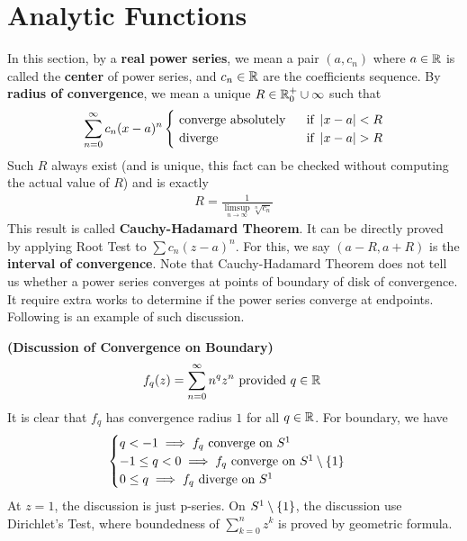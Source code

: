 \documentclass{report}
\begin{document}
\section{Analytic Functions}
\begin{mdframed}
In this section, by a  \textbf{real power series}, we mean a pair $(a,c_n)$ where $a \in\mathbb{R}$ is called the \textbf{center} of power series, and $c_n\in\mathbb{R}$ are the coefficients sequence. By \textbf{radius of convergence}, we mean a unique  $R \in \mathbb{R}^+_0 \cup  \infty$ such that 
 \begin{align*}
\sum_{n=0}^\infty c_n(x-a)^n
\begin{cases}
  \text{ converge absolutely }& \text{ if  }\abso{x-a}<R\\
  \text{ diverge }& \text{ if  }\abso{x-a}>R\\
\end{cases}
\end{align*}
Such $R$ always exist (and is unique, this fact can be checked without computing the actual value of $R$) and is exactly 
\begin{align}
\label{Cauchy-Hadamard}
R=\frac{1}{\limsup_{n\to\infty} \sqrt[n]{c_n} }
\end{align}
This result is called \textbf{Cauchy-Hadamard Theorem}. It can be directly proved by applying Root Test to $\sum c_n(z-a)^n$. For this, we say $(a-R,a+R)$ is the \textbf{interval of convergence}. Note that Cauchy-Hadamard Theorem does not tell us whether a power series converges at points of boundary of disk of convergence. It require extra works to determine if the power series converge at endpoints. Following is an example of such discussion.   
\begin{Example}{\textbf{(Discussion of Convergence on Boundary)}}{}
\begin{align*}
f_q(z)=\sum_{n=0}^\infty n^q z^n \text{ provided $q\in\mathbb{R}$ }
\end{align*}
It is clear that  $f_q$ has convergence radius  $1$ for all  $q\in\mathbb{R}$. For boundary, we have
\begin{align*}
\begin{cases}
  q<-1 \implies f_q\text{ converge on $S^1$ }\\
  -1\leq q<0 \implies f_q\text{ converge on }S^1\setminus \{ 1 \}\\
  0 \leq q \implies f_q \text{ diverge on }S^1
\end{cases}
\end{align*}
At $z=1$, the discussion is just p-series. On $S^1\setminus \{ 1 \}$, the discussion use Dirichlet's Test, where boundedness of $\sum^n_{k=0} z^k$ is proved by geometric formula.  

\end{Example}
\end{mdframed}
\end{document}
